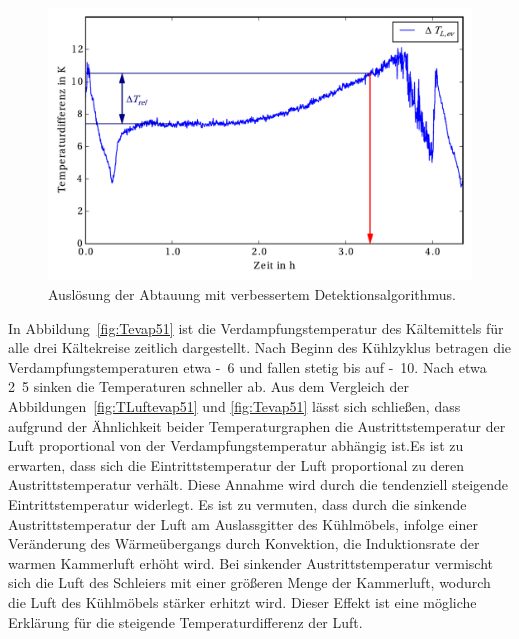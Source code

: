 \begin{figure}[h]
\centering
\includegraphics[scale=0.8]{Pictures/50/delTaT_evap1good.pdf}
\caption{Auslösung der Abtauung mit verbessertem Detektionsalgorithmus.}
\label{fig:deltaTLuftevap50good}
\end{figure}

In Abbildung~\ref{fig:Tevap51} ist die Verdampfungstemperatur des Kältemittels für alle drei Kältekreise zeitlich dargestellt. Nach Beginn des Kühlzyklus betragen die Verdampfungstemperaturen etwa \unit{-6}{\celsius} und fallen stetig bis auf \unit{-10}{\celsius}. Nach etwa \unit{2.5}{\hour} sinken die Temperaturen schneller ab. Aus dem Vergleich der Abbildungen~\ref{fig:TLuftevap51} und \ref{fig:Tevap51} lässt sich schließen, dass aufgrund der Ähnlichkeit beider Temperaturgraphen die Austrittstemperatur der Luft proportional von der Verdampfungstemperatur abhängig ist.\newline Es ist zu erwarten, dass sich die Eintrittstemperatur der Luft proportional zu deren Austrittstemperatur verhält. Diese Annahme wird durch die tendenziell steigende Eintrittstemperatur widerlegt. Es ist zu vermuten, dass durch die sinkende Austrittstemperatur der Luft am Auslassgitter des Kühlmöbels, infolge einer Veränderung des Wärmeübergangs durch Konvektion, die Induktionsrate der warmen Kammerluft erhöht wird. Bei sinkender Austrittstemperatur vermischt sich die Luft des Schleiers mit einer größeren Menge der Kammerluft, wodurch die Luft des Kühlmöbels stärker erhitzt wird.
Dieser Effekt ist eine mögliche Erklärung für die steigende Temperaturdifferenz der Luft.

